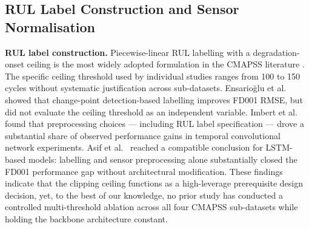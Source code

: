 \documentclass[preprint,10pt]{elsarticle}
\begin{document}
\subsection{RUL Label Construction and Sensor Normalisation}

\textbf{RUL label construction.} Piecewise-linear RUL labelling with a degradation-onset ceiling is the most widely adopted formulation in the CMAPSS literature \cite{ref05,ref06}. The specific ceiling threshold used by individual studies ranges from 100 to 150 cycles without systematic justification across sub-datasets. Ensario\u{g}lu et al.\ \cite{ref19} showed that change-point detection-based labelling improves FD001 RMSE, but did not evaluate the ceiling threshold as an independent variable. Imbert et al.\ \cite{ref18} found that preprocessing choices --- including RUL label specification --- drove a substantial share of observed performance gains in temporal convolutional network experiments. Asif et al.\ \cite{ref42} reached a compatible conclusion for LSTM-based models: labelling and sensor preprocessing alone substantially closed the FD001 performance gap without architectural modification. These findings indicate that the clipping ceiling functions as a high-leverage prerequisite design decision, yet, to the best of our knowledge, no prior study has conducted a controlled multi-threshold ablation across all four CMAPSS sub-datasets while holding the backbone architecture constant.
\end{document}
